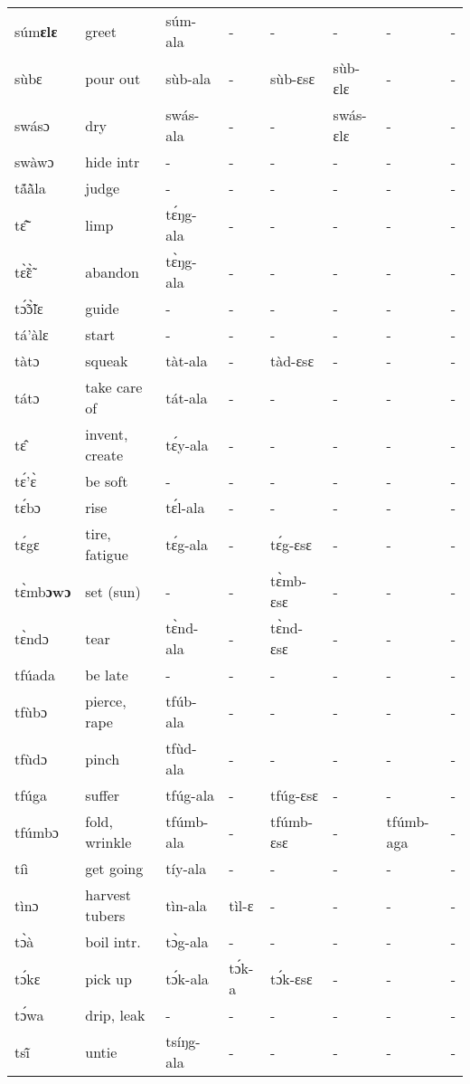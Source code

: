 \begin{sidewaystable}
\begin{longtable}{lp{3.5cm}llllll}
súm{\bfseries ɛlɛ} & greet & súm-ala & - & - & - & - &  - \\
sùbɛ & pour out & sùb-ala & - & sùb-ɛsɛ & sùb-ɛlɛ & - & - \\
swásɔ & dry & swás-ala & - & - & swás-ɛlɛ & - & - \\
swàwɔ & hide intr & - & - & - & - & - & - \\
tã́ã̀la & judge & - & - &  - & - &  - & - \\
tɛ̃̂ & limp & tɛ́ŋg-ala & - & - & - & - & - \\
tɛ̃̀ɛ̃̀ & abandon & tɛ̀ŋg-ala & - & - & - & - & - \\
tɔ̃́ɔ̃̀lɛ & guide & - & - & - & - & - & - \\
tá'àlɛ & start & -  & - & - & - & - & - \\
tàtɔ & squeak & tàt-ala & - & tàd-ɛsɛ & - &  - & - \\
tátɔ & take care of & tát-ala & - & - &  - & - & - \\
tɛ̂ & invent, create & tɛ́y-ala & - & - & - & - & - \\
tɛ́'ɛ̀ & be soft & - & - &  - & - & - & - \\
tɛ́bɔ & rise & tɛ́l-ala & - & - & - & - & - \\
tɛ́gɛ & tire, fatigue & tɛ́g-ala & - & tɛ́g-ɛsɛ  & - &  - & - \\
tɛ̀mb{\bfseries ɔwɔ} & set (sun) & - & - & tɛ̀mb-ɛsɛ & - & - & - \\
tɛ̀ndɔ & tear & tɛ̀nd-ala & - &  tɛ̀nd-ɛsɛ & - &  - &  - \\
tfúada & be late & - & - & - & - & - & - \\
tfùbɔ & pierce, rape & tfúb-ala & - & - & - & - &  - \\
tfùdɔ & pinch & tfùd-ala & - & - & -  & - &  - \\
tfúga & suffer & tfúg-ala & - & tfúg-ɛsɛ & - & - & - \\
tfúmbɔ & fold, wrinkle & tfúmb-ala & - & tfúmb-ɛsɛ & - & tfúmb-aga & - \\
tíì &  get going & tíy-ala & - & - & - & - &  - \\
tìnɔ & harvest tubers & tìn-ala & tìl-ɛ & - & - & - & - \\
tɔ̀à & boil intr. & tɔ̀g-ala & - & - & - & - & - \\
tɔ́kɛ & pick up & tɔ́k-ala & tɔ́k-a & tɔ́k-ɛsɛ & - &  - & - \\
tɔ́wa & drip, leak & - & - & - & - & - & - \\
tsĩ̂ & untie & tsíŋg-ala & - & - & - & - & - \\

\end{longtable}
\end{sidewaystable}
